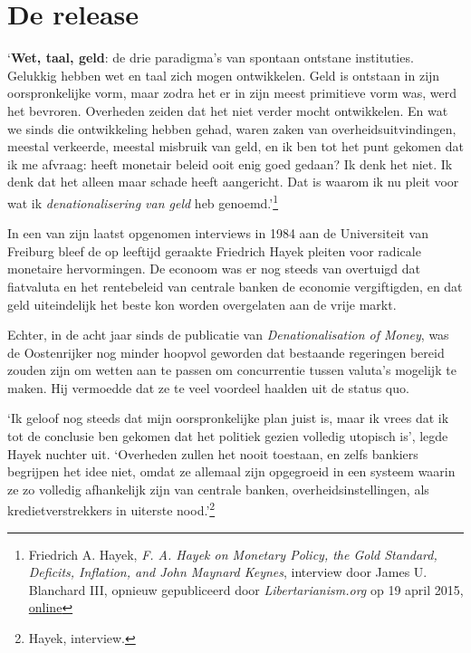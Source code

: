 \documentclass[
  a5paper,
  smalldemyvopaper,11pt,twoside,onecolumn,openright,extrafontsizes,
hidelinks]{memoir}
\renewenvironment{quote}%
               {\list{}{\rightmargin=.3cm\leftmargin=.3cm}%
                \itshape \item[]}%
               {\endlist}
\begin{document}
\chapter{De release}\label{de-release}

\begin{quote}
`\textbf{Wet, taal, geld}: de drie paradigma's van spontaan ontstane
instituties. Gelukkig hebben wet en taal zich mogen ontwikkelen. Geld is
ontstaan in zijn oorspronkelijke vorm, maar zodra het er in zijn meest
primitieve vorm was, werd het bevroren. Overheden zeiden dat het niet
verder mocht ontwikkelen. En wat we sinds die ontwikkeling hebben gehad,
waren zaken van overheidsuitvindingen, meestal verkeerde, meestal
misbruik van geld, en ik ben tot het punt gekomen dat ik me afvraag:
heeft monetair beleid ooit enig goed gedaan? Ik denk het niet. Ik denk
dat het alleen maar schade heeft aangericht. Dat is waarom ik nu pleit
voor wat ik \emph{denationalisering van geld} heb genoemd.'\footnote{Friedrich
  A. Hayek, \emph{F. A. Hayek on Monetary Policy, the Gold Standard,
  Deficits, Inflation, and John Maynard Keynes}, interview door James U.
  Blanchard III, opnieuw gepubliceerd door \emph{Libertarianism.org} op
  19 april 2015,
  \href{https://www.youtube.com/watch?v=EYhEDxFwFRU}{online}}
\end{quote}

In een van zijn laatst opgenomen interviews in 1984 aan de Universiteit
van Freiburg bleef de op leeftijd geraakte Friedrich Hayek pleiten voor
radicale monetaire hervormingen. De econoom was er nog steeds van
overtuigd dat fiatvaluta en het rentebeleid van centrale banken de
economie vergiftigden, en dat geld uiteindelijk het beste kon worden
overgelaten aan de vrije markt.

Echter, in de acht jaar sinds de publicatie van \emph{Denationalisation
of Money}, was de Oostenrijker nog minder hoopvol geworden dat bestaande
regeringen bereid zouden zijn om wetten aan te passen om concurrentie
tussen valuta's mogelijk te maken. Hij vermoedde dat ze te veel voordeel
haalden uit de status quo.

`Ik geloof nog steeds dat mijn oorspronkelijke plan juist is, maar ik
vrees dat ik tot de conclusie ben gekomen dat het politiek gezien
volledig utopisch is', legde Hayek nuchter uit. `Overheden zullen het
nooit toestaan, en zelfs bankiers begrijpen het idee niet, omdat ze
allemaal zijn opgegroeid in een systeem waarin ze zo volledig
afhankelijk zijn van centrale banken, overheidsinstellingen, als
kredietverstrekkers in uiterste nood.'\footnote{Hayek, interview.}
\end{document}
